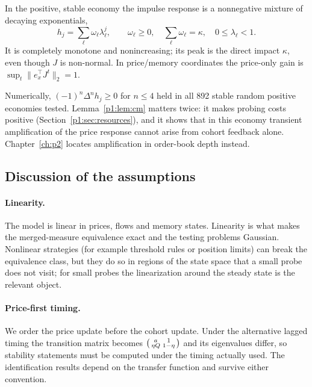 \begin{lemma}\label{p1:lem:cm}
In the positive, stable economy the impulse response is a nonnegative mixture of decaying exponentials,
\[
h_j=\sum_\ell \omega_\ell\lambda_\ell^j,\qquad \omega_\ell\ge0,\quad \sum_\ell\omega_\ell=\kappa,\quad 0\le\lambda_\ell<1 .
\]
It is completely monotone and nonincreasing; its peak is the direct impact $\kappa$, even though $J$ is non-normal. In price/memory coordinates the price-only gain is $\sup_t\|e_x^\top J^t\|_2=1$.
\end{lemma}

Numerically, $(-1)^n\Delta^nh_j\ge0$ for $n\le4$ held in all 892 stable random positive economies tested. Lemma~\ref{p1:lem:cm} matters twice: it makes probing costs positive (Section~\ref{p1:sec:resources}), and it shows that in this economy transient amplification of the price response cannot arise from cohort feedback alone. Chapter~\ref{ch:p2} locates amplification in order-book depth instead.

\subsection{Discussion of the assumptions}\label{p1:sec:assumptions}

\paragraph{Linearity.} The model is linear in prices, flows and memory states. Linearity is what makes the merged-measure equivalence exact and the testing problems Gaussian. Nonlinear strategies (for example threshold rules or position limits) can break the equivalence class, but they do so in regions of the state space that a small probe does not visit; for small probes the linearization around the steady state is the relevant object.

\paragraph{Price-first timing.} We order the price update before the cohort update. Under the alternative lagged timing the transition matrix becomes $\begin{psmallmatrix}a&1\\ \eta Q&1-\eta\end{psmallmatrix}$ and its eigenvalues differ, so stability statements must be computed under the timing actually used. The identification results depend on the transfer function and survive either convention.

